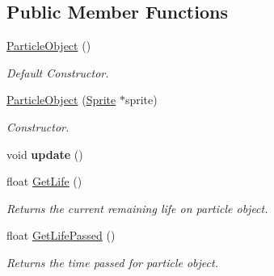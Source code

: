 \subsection*{Public Member Functions}
\begin{DoxyCompactItemize}
\item 
\mbox{\label{class_particle_object_a6071a8df79065cfc8cbb02898b09706c}} 
\mbox{\hyperlink{class_particle_object_a6071a8df79065cfc8cbb02898b09706c}{Particle\+Object}} ()
\begin{DoxyCompactList}\small\item\em Default Constructor. \end{DoxyCompactList}\item 
\mbox{\label{class_particle_object_a68676885f0457e0737568192fa9e15f7}} 
\mbox{\hyperlink{class_particle_object_a68676885f0457e0737568192fa9e15f7}{Particle\+Object}} (\mbox{\hyperlink{class_sprite}{Sprite}} $\ast$sprite)
\begin{DoxyCompactList}\small\item\em Constructor. \end{DoxyCompactList}\item 
\mbox{\label{class_particle_object_a26e462b7b677c7afdb21029c1c994887}} 
void {\bfseries update} ()
\item 
\mbox{\label{class_particle_object_ae64d28c67cc907a4c0d7b8cd369e2900}} 
float \mbox{\hyperlink{class_particle_object_ae64d28c67cc907a4c0d7b8cd369e2900}{Get\+Life}} ()
\begin{DoxyCompactList}\small\item\em Returns the current remaining life on particle object. \end{DoxyCompactList}\item 
\mbox{\label{class_particle_object_af1f1263c291261bcec3a65de1606ffaa}} 
float \mbox{\hyperlink{class_particle_object_af1f1263c291261bcec3a65de1606ffaa}{Get\+Life\+Passed}} ()
\begin{DoxyCompactList}\small\item\em Returns the time passed for particle object. \end{DoxyCompactList}\item 
\mbox{\label{class_particle_object_a47bfcd02614d825170995695cda65173}} 

\end{DoxyCompactItemize}
